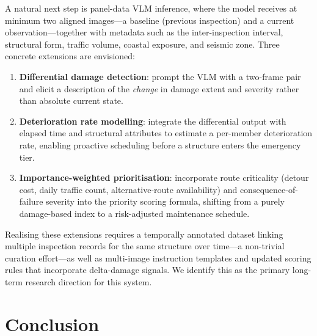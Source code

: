 \documentclass[twocolumn]{article}
\begin{document}
A natural next step is panel-data VLM inference, where the model receives
at minimum two aligned images---a baseline (previous inspection) and a
current observation---together with metadata such as the inter-inspection
interval, structural form, traffic volume, coastal exposure, and seismic
zone.  Three concrete extensions are envisioned:

\begin{enumerate}[leftmargin=*,itemsep=2pt]
  \item \textbf{Differential damage detection}: prompt the VLM with a
        two-frame pair and elicit a description of the \textit{change} in
        damage extent and severity rather than absolute current state.
  \item \textbf{Deterioration rate modelling}: integrate the differential
        output with elapsed time and structural attributes to estimate a
        per-member deterioration rate, enabling proactive scheduling before
        a structure enters the emergency tier.
  \item \textbf{Importance-weighted prioritisation}: incorporate route
        criticality (detour cost, daily traffic count, alternative-route
        availability) and consequence-of-failure severity into the priority
        scoring formula, shifting from a purely damage-based index to a
        risk-adjusted maintenance schedule.
\end{enumerate}

Realising these extensions requires a temporally annotated dataset linking
multiple inspection records for the same structure over time---a non-trivial
curation effort---as well as multi-image instruction templates and updated
scoring rules that incorporate delta-damage signals.  We identify this as
the primary long-term research direction for this system.

\section{Conclusion}
\label{sec:conclusion}
\end{document}
